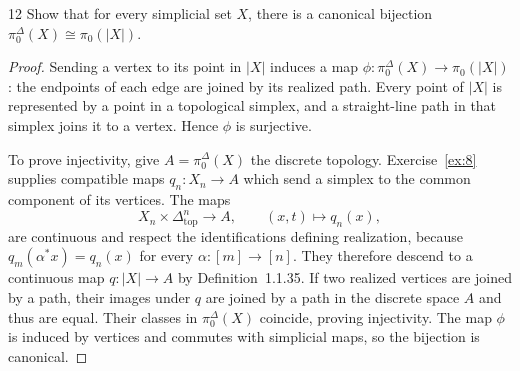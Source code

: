 \begin{exercise}{12}
Show that for every simplicial set $X$, there is a canonical bijection
$\pi_0^\Delta(X)\cong\pi_0(|X|)$.

\begin{proof}
Sending a vertex to its point in $|X|$ induces a map
$\phi\colon\pi_0^\Delta(X)\to\pi_0(|X|)$: the endpoints of each
edge are joined by its realized path. Every point of $|X|$ is
represented by a point in a topological simplex, and a straight-line
path in that simplex joins it to a vertex. Hence $\phi$ is surjective.

To prove injectivity, give $A=\pi_0^\Delta(X)$ the discrete topology.
Exercise~\ref{ex:8} supplies compatible maps $q_n\colon X_n\to A$
which send a simplex to the common component of its vertices.
The maps
\[
 X_n\times\Delta^n_{\mathrm{top}}\longrightarrow A,
 \qquad (x,t)\longmapsto q_n(x),
\]
are continuous and respect the identifications defining realization,
because $q_m(\alpha^*x)=q_n(x)$ for every
$\alpha\colon[m]\to[n]$. They therefore descend to a continuous map
$q\colon|X|\to A$ by Definition~1.1.35.
If two realized vertices are joined by a path, their images under $q$
are joined by a path in the discrete space $A$ and thus are equal.
Their classes in $\pi_0^\Delta(X)$ coincide, proving injectivity.
The map $\phi$ is induced by vertices and commutes with simplicial
maps, so the bijection is canonical.
\end{proof}
\end{exercise}
